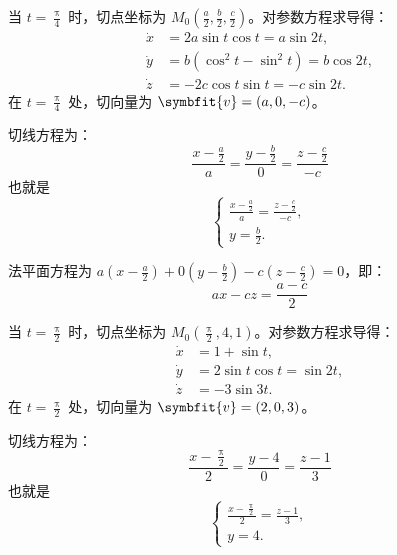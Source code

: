 \begin{solution}
    当 $t = \frac{\uppi}{4}$ 时，切点坐标为 $M_0 \left( \frac{a}{2}, \frac{b}{2}, \frac{c}{2} \right)$。对参数方程求导得：
    \begin{equation}
        \begin{aligned}
            \dot{x} & = 2a \sin t \cos t = a \sin 2t,       \\
            \dot{y} & = b(\cos^2 t - \sin^2 t) = b \cos 2t, \\
            \dot{z} & = -2c \cos t \sin t = -c \sin 2t.
        \end{aligned}
    \end{equation}
    在 $t = \frac{\uppi}{4}$ 处，切向量为 $\symbfit{v} = (a, 0, -c)$。

    切线方程为：
    \begin{equation}
        \boxed{\frac{x - \frac{a}{2}}{a} = \frac{y - \frac{b}{2}}{0} = \frac{z - \frac{c}{2}}{-c}}
    \end{equation}
    也就是
    \begin{equation}
        \boxed{
            \begin{cases}
                \frac{x - \frac{a}{2}}{a} = \frac{z - \frac{c}{2}}{-c},
                \\ y = \frac{b}{2}.
            \end{cases}
        }
    \end{equation}

    法平面方程为 $a\left(x - \frac{a}{2}\right) + 0\left(y - \frac{b}{2}\right) - c\left(z - \frac{c}{2}\right) = 0$，即：
    \begin{equation}
        \boxed{ax - cz = \frac{a - c}{2}}
    \end{equation}

    当 $t = \frac{\uppi}{2}$ 时，切点坐标为 $M_0 \left( \frac{\uppi}{2}, 4, 1 \right)$。对参数方程求导得：
    \begin{equation}
        \begin{aligned}
            \dot{x} & = 1 + \sin t,                \\
            \dot{y} & = 2 \sin t \cos t = \sin 2t, \\
            \dot{z} & = -3 \sin 3t.
        \end{aligned}
    \end{equation}
    在 $t = \frac{\uppi}{2}$ 处，切向量为 $\symbfit{v} = (2, 0, 3)$。

    切线方程为：
    \begin{equation}
        \boxed{\frac{x - \frac{\uppi}{2}}{2} = \frac{y - 4}{0} = \frac{z - 1}{3}}
    \end{equation}
    也就是
    \begin{equation}
        \boxed{
            \begin{cases}
                \frac{x - \frac{\uppi}{2}}{2} = \frac{z - 1}{3},
                \\ y = 4.
            \end{cases}
        }
    \end{equation}


\end{solution}
